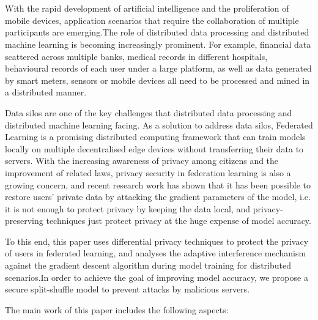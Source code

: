 \newpage
\vspace{-1cm}
\chapter*{}

With the rapid development of artificial intelligence and the proliferation of mobile devices, application scenarios that require the collaboration of multiple participants are emerging.The role of distributed data processing and distributed machine learning is becoming increasingly prominent. For example, financial data scattered across multiple banks, medical records in different hospitals, behavioural records of each user under a large platform, as well as data generated by smart meters, sensors or mobile devices all need to be processed and mined in a distributed manner. 

Data silos are one of the key challenges that distributed data processing and distributed machine learning facing. As a solution to address data silos, Federated Learning is a promising distributed computing framework that can train models locally on multiple decentralised edge devices without transferring their data to servers. With the increasing awareness of privacy among citizens and the improvement of related laws, privacy security in federation learning is also a growing concern, and recent research work has shown that it has been possible to restore users' private data by attacking the gradient parameters of the model, i.e. it is not enough to protect privacy by keeping the data local, and privacy-preserving techniques just protect privacy at the huge expense of model accuracy. 

To this end, this paper uses differential privacy techniques to protect the privacy of users in federated learning, and analyses the adaptive interference mechanism against the gradient descent algorithm during model training for distributed scenarios.In order to achieve the goal of improving model accuracy, we propose a secure split-shuffle model to prevent attacks by malicious servers. 

The main work of this paper includes the following aspects:

